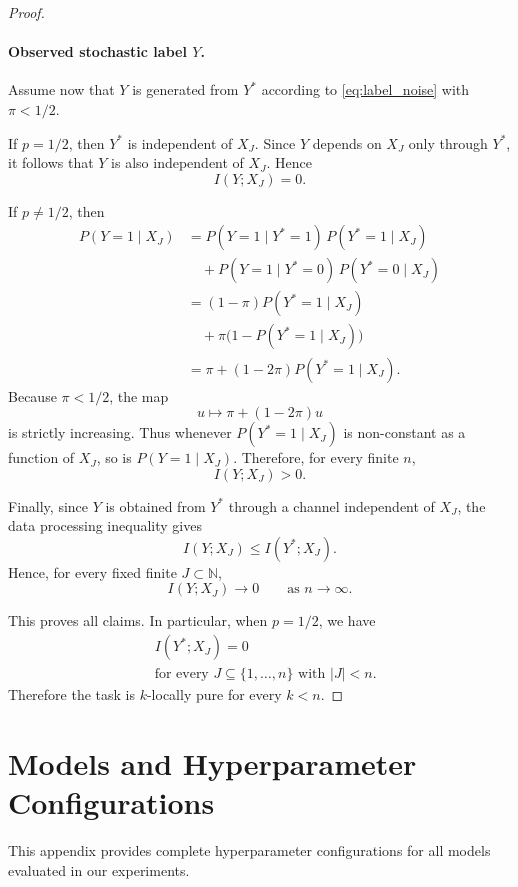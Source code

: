 \documentclass{article} %
\theoremstyle{plain}
\theoremstyle{definition}
\theoremstyle{remark}
\begin{document}
\begin{proof}
\paragraph{Observed stochastic label \(Y\).}
Assume now that \(Y\) is generated from \(Y^*\) according to \eqref{eq:label_noise}
with \(\pi<1/2\).

If \(p=1/2\), then \(Y^*\) is independent of \(X_J\). Since \(Y\) depends on \(X_J\)
only through \(Y^*\), it follows that \(Y\) is also independent of \(X_J\). Hence
\[
I(Y;X_J)=0.
\]

If \(p\neq 1/2\), then
\begin{align*}
P(Y=1\mid X_J)
&=
P(Y=1\mid Y^*=1)\,P(Y^*=1\mid X_J) \\
&\quad +
P(Y=1\mid Y^*=0)\,P(Y^*=0\mid X_J) \\
&=
(1-\pi)P(Y^*=1\mid X_J)\\
&\quad+
\pi\bigl(1-P(Y^*=1\mid X_J)\bigr) \\
&=
\pi + (1-2\pi)P(Y^*=1\mid X_J).
\end{align*}
Because \(\pi<1/2\), the map
\[
u \mapsto \pi + (1-2\pi)u
\]
is strictly increasing. Thus whenever \(P(Y^*=1\mid X_J)\) is non-constant as a
function of \(X_J\), so is \(P(Y=1\mid X_J)\). Therefore, for every finite \(n\),
\[
I(Y;X_J)>0.
\]

Finally, since \(Y\) is obtained from \(Y^*\) through a channel independent of \(X_J\),
the data processing inequality gives
\[
I(Y;X_J)\le I(Y^*;X_J).
\]
Hence, for every fixed finite \(J\subset\mathbb N\),
\[
I(Y;X_J)\to 0
\qquad\text{as } n\to\infty.
\]

This proves all claims. In particular, when \(p=1/2\), we have
\[
\begin{aligned}
&I(Y^*;X_J)=0\\
&\text{for every } J\subseteq \{1,\ldots,n\}\text{ with } |J|<n.
\end{aligned}
\]
Therefore the task is \(k\)-locally pure for every \(k<n\).
\end{proof}


\section{Models and Hyperparameter Configurations}
\label{appendix:training}

This appendix provides complete hyperparameter configurations for all models evaluated in our experiments.
\end{document}
